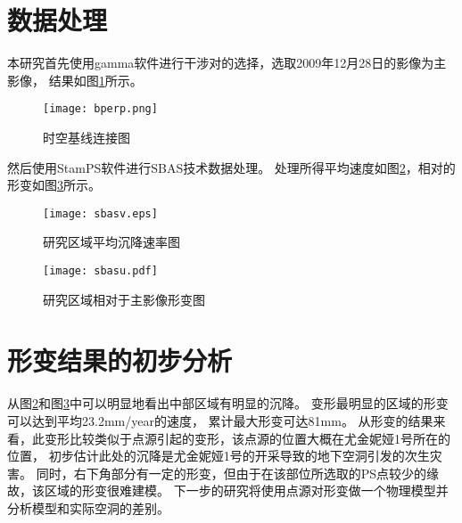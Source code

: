 \section{数据处理}
本研究首先使用gamma软件进行干涉对的选择，选取2009年12月28日的影像为主影像，
结果如图\ref{fig:bprep}所示。
\begin{figure}[htb]
    \centering
    \texttt{[image: bperp.png]}
    \caption{时空基线连接图}
    \label{fig:bprep}
\end{figure}
然后使用StamPS软件进行SBAS技术数据处理。
处理所得平均速度如图\ref{fig:sbasv}，相对的形变如图\ref{fig:sbasu}所示。
\begin{figure}[htb]
    \centering
    \texttt{[image: sbasv.eps]}
    \caption{研究区域平均沉降速率图}
    \label{fig:sbasv}
\end{figure}
\begin{figure}[htb]
    \centering
    \texttt{[image: sbasu.pdf]}
    \caption{研究区域相对于主影像形变图}
    \label{fig:sbasu}
\end{figure}

\section{形变结果的初步分析}
从图\ref{fig:sbasv}和图\ref{fig:sbasu}中可以明显地看出中部区域有明显的沉降。
变形最明显的区域的形变可以达到平均23.2mm/year的速度，
累计最大形变可达81mm。
从形变的结果来看，此变形比较类似于点源引起的变形，该点源的位置大概在尤金妮娅1号所在的位置，
初步估计此处的沉降是尤金妮娅1号的开采导致的地下空洞引发的次生灾害。
同时，右下角部分有一定的形变，但由于在该部位所选取的PS点较少的缘故，该区域的形变很难建模。
下一步的研究将使用点源对形变做一个物理模型并分析模型和实际空洞的差别。
